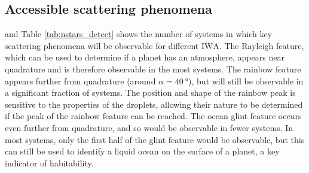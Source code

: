 \documentclass[usenatbib]{mnras}
\newcommand{\IWA}{\ensuremath{\mathrm{IWA}}\xspace}
\newcommand{\HWO}{HabWorlds\xspace}
\begin{document}
\subsection{Accessible scattering phenomena}

 and Table \ref{tab:nstars_detect} shows the number of systems in which key scattering phenomena will be observable for different \IWA.
The Rayleigh feature, which can be used to determine if a planet has an atmosphere, appears near quadrature and is therefore observable in the most systems.
The rainbow feature appears further from quadrature (around $\alpha=\qty{40}{\degree}$), but will still be observable in a significant fraction of systems.
The position and shape of the rainbow peak is sensitive to the properties of the droplets, allowing their nature to be determined if the peak of the rainbow feature can be reached.
The ocean glint feature occurs even further from quadrature, and so would be observable in fewer systems. 
In most systems, only the first half of the glint feature would be observable, but this can still be used to identify a liquid ocean on the surface of a planet, a key indicator of habitability. 
\end{document}
